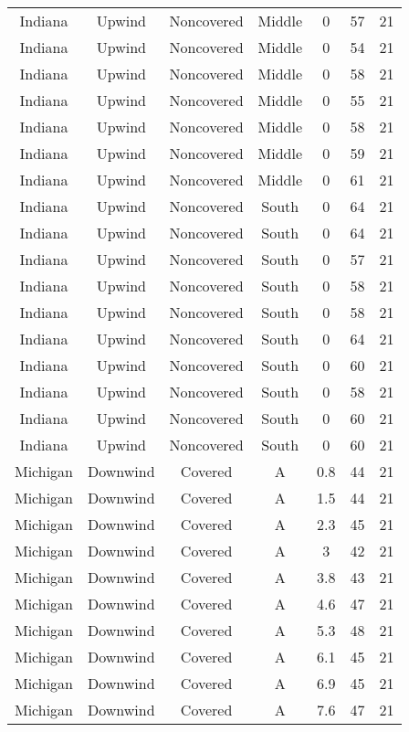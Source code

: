 \documentclass{article}
\begin{document}
\begin{longtable}[H]{ccccccc}
Indiana & Upwind   & Noncovered & Middle & 0    & 57 & 21 \\
Indiana & Upwind   & Noncovered & Middle & 0    & 54 & 21 \\
Indiana & Upwind   & Noncovered & Middle & 0    & 58 & 21 \\
Indiana & Upwind   & Noncovered & Middle & 0    & 55 & 21 \\
Indiana & Upwind   & Noncovered & Middle & 0    & 58 & 21 \\
Indiana & Upwind   & Noncovered & Middle & 0    & 59 & 21 \\
Indiana & Upwind   & Noncovered & Middle & 0    & 61 & 21 \\
Indiana & Upwind   & Noncovered & South  & 0    & 64 & 21 \\
Indiana & Upwind   & Noncovered & South  & 0    & 64 & 21 \\
Indiana & Upwind   & Noncovered & South  & 0    & 57 & 21 \\
Indiana & Upwind   & Noncovered & South  & 0    & 58 & 21 \\
Indiana & Upwind   & Noncovered & South  & 0    & 58 & 21 \\
Indiana & Upwind   & Noncovered & South  & 0    & 64 & 21 \\
Indiana & Upwind   & Noncovered & South  & 0    & 60 & 21 \\
Indiana & Upwind   & Noncovered & South  & 0    & 58 & 21 \\
Indiana & Upwind   & Noncovered & South  & 0    & 60 & 21 \\
Indiana & Upwind   & Noncovered & South  & 0    & 60 & 21 \\
Michigan & Downwind & Covered     & A & 0.8  & 44 & 21 \\
Michigan & Downwind & Covered     & A & 1.5  & 44 & 21 \\
Michigan & Downwind & Covered     & A & 2.3  & 45 & 21 \\
Michigan & Downwind & Covered     & A & 3    & 42 & 21 \\
Michigan & Downwind & Covered     & A & 3.8  & 43 & 21 \\
Michigan & Downwind & Covered     & A & 4.6  & 47 & 21 \\
Michigan & Downwind & Covered     & A & 5.3  & 48 & 21 \\
Michigan & Downwind & Covered     & A & 6.1  & 45 & 21 \\
Michigan & Downwind & Covered     & A & 6.9  & 45 & 21 \\
Michigan & Downwind & Covered     & A & 7.6  & 47 & 21 \\

\end{longtable}
\end{document}
